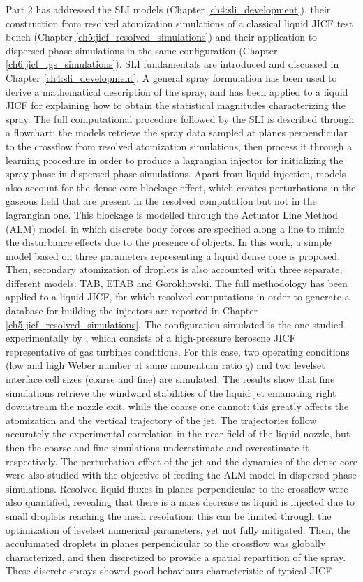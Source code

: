 Part 2 has addressed the SLI models (Chapter \ref{ch4:sli_development}), their construction from resolved atomization simulations of a classical liquid JICF test bench (Chapter \ref{ch5:jicf_resolved_simulations}) and their application to dispersed-phase simulations in the same configuration (Chapter \ref{ch6:jicf_lgs_simulations}). SLI fundamentals are introduced and discussed in Chapter \ref{ch4:sli_development}. A general spray formulation has been used to derive  a mathematical description of the spray, and has been applied to a liquid JICF for explaining how to obtain the statistical magnitudes characterizing the spray. The full computational procedure followed by the SLI is described through a flowchart: the models retrieve the spray data sampled at planes perpendicular to the crossflow from resolved atomization simulations, then process it through a learning procedure in order to produce a lagrangian injector for initializing the spray phase in dispersed-phase simulations. Apart from liquid injection, models also account for the dense core blockage effect, which creates perturbations in the gaseous field that are present in the resolved computation but not in the lagrangian one. This blockage is modelled through the Actuator Line Method (ALM) model, in which discrete body forces are specified along a line to mimic the disturbance effects due to the presence of objects. In this work, a simple model based on three parameters representing a liquid dense core is proposed. Then, secondary atomization of droplets is also accounted with three separate, different models: TAB, ETAB and Gorokhovski. The full methodology has been applied to a liquid JICF, for which resolved computations in order to generate a database for building the injectors are reported in Chapter \ref{ch5:jicf_resolved_simulations}. The configuration simulated is the one studied experimentally by , which consists of a high-pressure kerosene JICF representative of gas turbines conditions. For this case, two operating conditions (low and high Weber number at same momentum ratio $q$) and two levelset interface cell sizes (coarse and fine) are simulated. The results show that fine simulations retrieve the windward stabilities of the liquid jet emanating right downstream the nozzle exit, while the coarse one cannot: this greatly affects the atomization and the vertical trajectory of the jet. The trajectories follow accurately the experimental correlation in the near-field of the liquid nozzle, but then the coarse and fine simulations underestimate and overestimate it respectively. The perturbation effect of the jet and the dynamics of the dense core were also studied with the objective of feeding the ALM model in dispersed-phase simulations. Resolved liquid fluxes in planes perpendicular to the crossflow were also quantified, revealing that there is a mass decrease as liquid is injected due to small droplets reaching the mesh resolution:  this can be limited through the optimization of levelset numerical parameters, yet not fully mitigated. Then, the acculumated droplets in planes perpendicular to the crossflow  was globally characterized, and then discretized to provide a spatial repartition of the spray. These discrete sprays showed good behaviours characteristic of typical JICF 